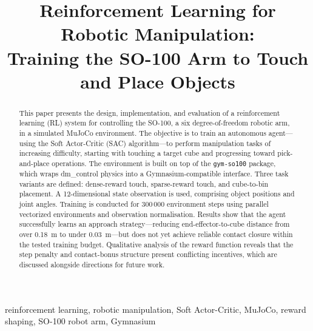 \documentclass[conference]{IEEEtran}
\newcommand{\todo}[1]{\textcolor{red}{[TODO: #1]}}  %
\begin{document}
\title{Reinforcement Learning for Robotic Manipulation:\\
       Training the SO-100 Arm to Touch and Place Objects}

\author{
    \IEEEauthorblockA{
        Department of \todo{Your Department}\\
        \todo{Your University}\\
        \todo{your.email@university.edu}
    }
}

\maketitle

\begin{abstract}

This paper presents the design, implementation, and evaluation of a
reinforcement learning (RL) system for controlling the SO-100, a six
degree-of-freedom robotic arm, in a simulated MuJoCo environment.
The objective is to train an autonomous agent—using the Soft
Actor-Critic (SAC) algorithm—to perform manipulation tasks of
increasing difficulty, starting with touching a target cube and
progressing toward pick-and-place operations.
The environment is built on top of the \texttt{gym-so100} package,
which wraps dm\_control physics into a Gymnasium-compatible interface.
Three task variants are defined: dense-reward touch, sparse-reward
touch, and cube-to-bin placement.
A 12-dimensional state observation is used, comprising object
positions and joint angles.
Training is conducted for 300\,000 environment steps using
parallel vectorized environments and observation normalisation.
Results show that the agent successfully learns an approach
strategy—reducing end-effector-to-cube distance from over 0.18~m to
under 0.03~m—but does not yet achieve reliable contact closure
within the tested training budget.
Qualitative analysis of the reward function reveals that the
step penalty and contact-bonus structure present conflicting
incentives, which are discussed alongside directions for future work.

\end{abstract}

\begin{IEEEkeywords}
reinforcement learning, robotic manipulation, Soft Actor-Critic,
MuJoCo, reward shaping, SO-100 robot arm, Gymnasium
\end{IEEEkeywords}
\end{document}
